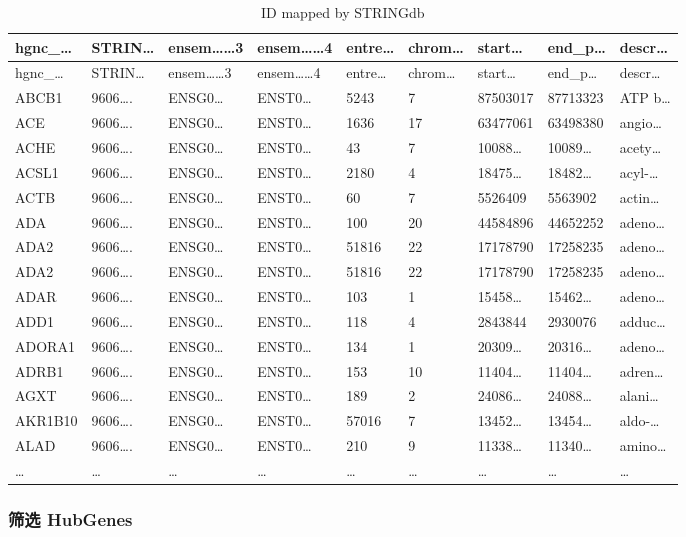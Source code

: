 \documentclass[
]{article}
\begin{document}
\begin{longtable}[]{@{}lllllllll@{}}
\caption{\label{tab:ID-mapped-by-STRINGdb}ID mapped by STRINGdb}\tabularnewline
\toprule
hgnc\_\ldots{} & STRIN\ldots{} & ensem\ldots\ldots3 & ensem\ldots\ldots4 & entre\ldots{} & chrom\ldots{} & start\ldots{} & end\_p\ldots{} & descr\ldots{}\tabularnewline
\midrule
\endfirsthead
\toprule
hgnc\_\ldots{} & STRIN\ldots{} & ensem\ldots\ldots3 & ensem\ldots\ldots4 & entre\ldots{} & chrom\ldots{} & start\ldots{} & end\_p\ldots{} & descr\ldots{}\tabularnewline
\midrule
\endhead
ABCB1 & 9606\ldots. & ENSG0\ldots{} & ENST0\ldots{} & 5243 & 7 & 87503017 & 87713323 & ATP b\ldots{}\tabularnewline
ACE & 9606\ldots. & ENSG0\ldots{} & ENST0\ldots{} & 1636 & 17 & 63477061 & 63498380 & angio\ldots{}\tabularnewline
ACHE & 9606\ldots. & ENSG0\ldots{} & ENST0\ldots{} & 43 & 7 & 10088\ldots{} & 10089\ldots{} & acety\ldots{}\tabularnewline
ACSL1 & 9606\ldots. & ENSG0\ldots{} & ENST0\ldots{} & 2180 & 4 & 18475\ldots{} & 18482\ldots{} & acyl-\ldots{}\tabularnewline
ACTB & 9606\ldots. & ENSG0\ldots{} & ENST0\ldots{} & 60 & 7 & 5526409 & 5563902 & actin\ldots{}\tabularnewline
ADA & 9606\ldots. & ENSG0\ldots{} & ENST0\ldots{} & 100 & 20 & 44584896 & 44652252 & adeno\ldots{}\tabularnewline
ADA2 & 9606\ldots. & ENSG0\ldots{} & ENST0\ldots{} & 51816 & 22 & 17178790 & 17258235 & adeno\ldots{}\tabularnewline
ADA2 & 9606\ldots. & ENSG0\ldots{} & ENST0\ldots{} & 51816 & 22 & 17178790 & 17258235 & adeno\ldots{}\tabularnewline
ADAR & 9606\ldots. & ENSG0\ldots{} & ENST0\ldots{} & 103 & 1 & 15458\ldots{} & 15462\ldots{} & adeno\ldots{}\tabularnewline
ADD1 & 9606\ldots. & ENSG0\ldots{} & ENST0\ldots{} & 118 & 4 & 2843844 & 2930076 & adduc\ldots{}\tabularnewline
ADORA1 & 9606\ldots. & ENSG0\ldots{} & ENST0\ldots{} & 134 & 1 & 20309\ldots{} & 20316\ldots{} & adeno\ldots{}\tabularnewline
ADRB1 & 9606\ldots. & ENSG0\ldots{} & ENST0\ldots{} & 153 & 10 & 11404\ldots{} & 11404\ldots{} & adren\ldots{}\tabularnewline
AGXT & 9606\ldots. & ENSG0\ldots{} & ENST0\ldots{} & 189 & 2 & 24086\ldots{} & 24088\ldots{} & alani\ldots{}\tabularnewline
AKR1B10 & 9606\ldots. & ENSG0\ldots{} & ENST0\ldots{} & 57016 & 7 & 13452\ldots{} & 13454\ldots{} & aldo-\ldots{}\tabularnewline
ALAD & 9606\ldots. & ENSG0\ldots{} & ENST0\ldots{} & 210 & 9 & 11338\ldots{} & 11340\ldots{} & amino\ldots{}\tabularnewline
\ldots{} & \ldots{} & \ldots{} & \ldots{} & \ldots{} & \ldots{} & \ldots{} & \ldots{} & \ldots{}\tabularnewline
\bottomrule
\end{longtable}

\hypertarget{hubs}{%
\subsubsection{筛选 HubGenes}\label{hubs}}
\end{document}
